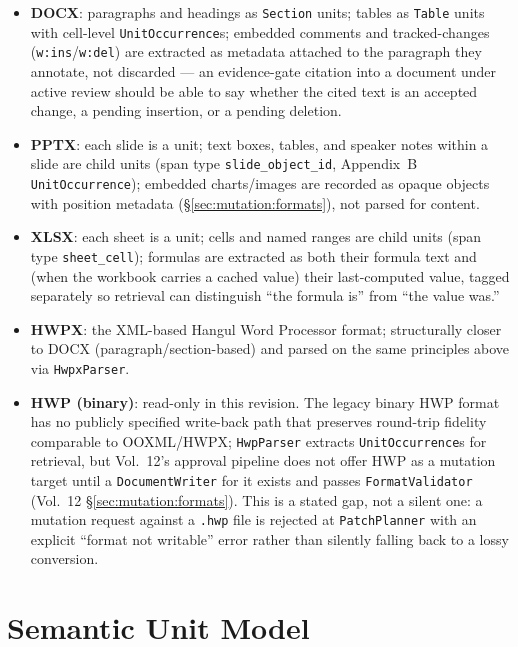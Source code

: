 \begin{itemize}
  \item \textbf{DOCX}: paragraphs and headings as \texttt{Section} units; tables as \texttt{Table} units with cell-level \texttt{UnitOccurrence}s; embedded comments and tracked-changes (\texttt{w:ins}/\texttt{w:del}) are extracted as metadata attached to the paragraph they annotate, not discarded --- an evidence-gate citation into a document under active review should be able to say whether the cited text is an accepted change, a pending insertion, or a pending deletion.
  \item \textbf{PPTX}: each slide is a unit; text boxes, tables, and speaker notes within a slide are child units (span type \texttt{slide\_object\_id}, Appendix~B \texttt{UnitOccurrence}); embedded charts/images are recorded as opaque objects with position metadata (\S\ref{sec:mutation:formats}), not parsed for content.
  \item \textbf{XLSX}: each sheet is a unit; cells and named ranges are child units (span type \texttt{sheet\_cell}); formulas are extracted as both their formula text and (when the workbook carries a cached value) their last-computed value, tagged separately so retrieval can distinguish ``the formula is'' from ``the value was.''
  \item \textbf{HWPX}: the XML-based Hangul Word Processor format; structurally closer to DOCX (paragraph/section-based) and parsed on the same principles above via \texttt{HwpxParser}.
  \item \textbf{HWP (binary)}: read-only in this revision. The legacy binary HWP format has no publicly specified write-back path that preserves round-trip fidelity comparable to OOXML/HWPX; \texttt{HwpParser} extracts \texttt{UnitOccurrence}s for retrieval, but Vol.~12's approval pipeline does not offer HWP as a mutation target until a \texttt{DocumentWriter} for it exists and passes \texttt{FormatValidator} (Vol.~12 \S\ref{sec:mutation:formats}). This is a stated gap, not a silent one: a mutation request against a \texttt{.hwp} file is rejected at \texttt{PatchPlanner} with an explicit ``format not writable'' error rather than silently falling back to a lossy conversion.
\end{itemize}

\section{Semantic Unit Model}
\label{sec:parsing:semantic-unit}

